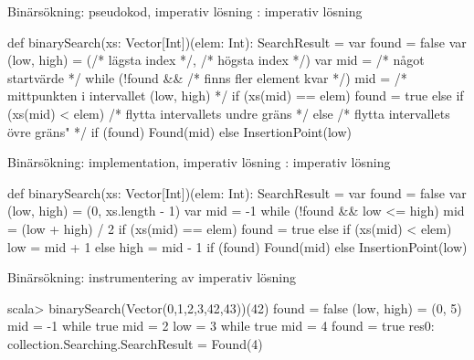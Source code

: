 \begin{Slide}{Binärsökning: pseudokod, imperativ lösning}
: imperativ lösning
\begin{Code}
def binarySearch(xs: Vector[Int])(elem: Int): SearchResult = {
  var found = false
  var (low, high) = (/* lägsta index */, /* högsta index */)
  var mid = /* något startvärde */
  while (!found && /* finns fler element kvar */) {
    mid = /* mittpunkten i intervallet (low, high) */
    if (xs(mid) == elem) found = true
    else if (xs(mid) < elem) /* flytta intervallets undre gräns */
    else /* flytta intervallets övre gräns" */
  }
  if (found) Found(mid)
  else InsertionPoint(low)
}
\end{Code}
\end{Slide}



\begin{Slide}{Binärsökning: implementation, imperativ lösning}
: imperativ lösning
\begin{Code}
def binarySearch(xs: Vector[Int])(elem: Int): SearchResult = {
  var found = false
  var (low, high) = (0, xs.length - 1)
  var mid = -1
  while (!found && low <= high) {
    mid = (low + high) / 2
    if (xs(mid) == elem) found = true
    else if (xs(mid) < elem) low = mid + 1
    else high = mid - 1
  }
  if (found) Found(mid)
  else InsertionPoint(low)
}
\end{Code}
\end{Slide}

\begin{Slide}{Binärsökning: instrumentering av imperativ lösning}
\vspace{-0.5em}
\vspace{-0.5em}
\begin{REPL}[basicstyle=\color{white}\ttfamily\SlideFontSize{6}{7}]
scala> binarySearch(Vector(0,1,2,3,42,43))(42)
found = false
(low, high) = (0, 5)
mid = -1
while true
mid = 2
low = 3
while true
mid = 4
found = true
res0: collection.Searching.SearchResult = Found(4)
\end{REPL}
\end{Slide}

